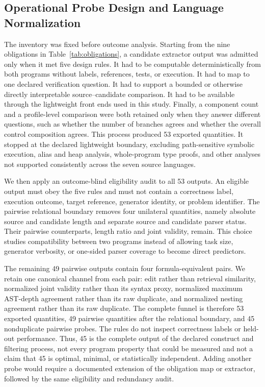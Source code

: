 \documentclass[conference]{IEEEtran}
\begin{document}
\subsection{Operational Probe Design and Language Normalization}
The inventory was fixed before outcome analysis. Starting from the nine obligations in Table~\ref{tab:obligations}, a candidate extractor output was admitted only when it met five design rules. It had to be computable deterministically from both programs without labels, references, tests, or execution. It had to map to one declared verification question. It had to support a bounded or otherwise directly interpretable source--candidate comparison. It had to be available through the lightweight front ends used in this study. Finally, a component count and a profile-level comparison were both retained only when they answer different questions, such as whether the number of branches agrees and whether the overall control composition agrees. This process produced 53 exported quantities. It stopped at the declared lightweight boundary, excluding path-sensitive symbolic execution, alias and heap analysis, whole-program type proofs, and other analyses not supported consistently across the seven source languages.

We then apply an outcome-blind eligibility audit to all 53 outputs. An eligible output must obey the five rules and must not contain a correctness label, execution outcome, target reference, generator identity, or problem identifier. The pairwise relational boundary removes four unilateral quantities, namely absolute source and candidate length and separate source and candidate parser status. Their pairwise counterparts, length ratio and joint validity, remain. This choice studies compatibility between two programs instead of allowing task size, generator verbosity, or one-sided parser coverage to become direct predictors.

The remaining 49 pairwise outputs contain four formula-equivalent pairs. We retain one canonical channel from each pair: edit rather than retrieval similarity, normalized joint validity rather than its syntax proxy, normalized maximum AST-depth agreement rather than its raw duplicate, and normalized nesting agreement rather than its raw duplicate. The complete funnel is therefore 53 exported quantities, 49 pairwise quantities after the relational boundary, and 45 nonduplicate pairwise probes. The rules do not inspect correctness labels or held-out performance. Thus, 45 is the complete output of the declared construct and filtering process, not every program property that could be measured and not a claim that 45 is optimal, minimal, or statistically independent. Adding another probe would require a documented extension of the obligation map or extractor, followed by the same eligibility and redundancy audit.
\end{document}
